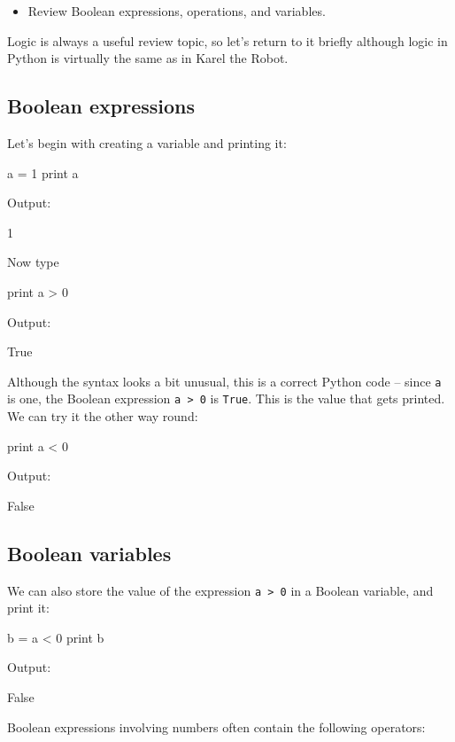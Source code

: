 \begin{itemize}
\item Review Boolean expressions, operations, and variables.
\end{itemize}
Logic is always a useful review topic, so let's return to it briefly although logic in Python is 
virtually the same as in Karel the Robot.

\subsection{Boolean expressions}

Let's begin with creating a variable 
and printing it:

\begin{bluecode}
a = 1
print a
\end{bluecode}
Output:

\begin{greencode}
1
\end{greencode}
Now type

\begin{bluecode}
print a > 0
\end{bluecode}
Output:

\begin{greencode}
True
\end{greencode}
Although the syntax looks a bit unusual, this is a correct
Python code -- since {\tt a} is one, the Boolean expression {\tt a > 0}
is {\tt True}. This is the value that gets printed. We can try it the other 
way round:

\begin{bluecode}
print a < 0
\end{bluecode}
Output:

\begin{greencode}
False
\end{greencode}

\subsection{Boolean variables}

We can also store the value of the expression {\tt a > 0} in a Boolean variable,
and print it:
\begin{bluecode}
b = a < 0
print b
\end{bluecode}
Output:

\begin{greencode}
False
\end{greencode}
Boolean expressions involving numbers often contain the following operators:

